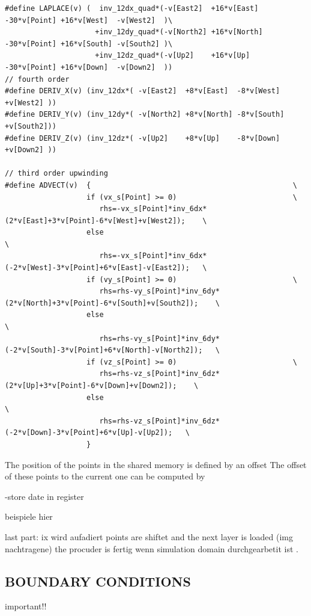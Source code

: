 \begin{verbatim}
#define LAPLACE(v) (  inv_12dx_quad*(-v[East2]  +16*v[East]  -30*v[Point] +16*v[West]  -v[West2]  )\
                     +inv_12dy_quad*(-v[North2] +16*v[North] -30*v[Point] +16*v[South] -v[South2] )\
                     +inv_12dz_quad*(-v[Up2]    +16*v[Up]    -30*v[Point] +16*v[Down]  -v[Down2]  ))
// fourth order
#define DERIV_X(v) (inv_12dx*( -v[East2]  +8*v[East]  -8*v[West]  +v[West2] ))
#define DERIV_Y(v) (inv_12dy*( -v[North2] +8*v[North] -8*v[South] +v[South2]))
#define DERIV_Z(v) (inv_12dz*( -v[Up2]    +8*v[Up]    -8*v[Down]  +v[Down2] ))

// third order upwinding
#define ADVECT(v)  {                                               \
                   if (vx_s[Point] >= 0)                           \
                      rhs=-vx_s[Point]*inv_6dx*(2*v[East]+3*v[Point]-6*v[West]+v[West2]);    \
                   else                                                           \
                      rhs=-vx_s[Point]*inv_6dx*(-2*v[West]-3*v[Point]+6*v[East]-v[East2]);   \
                   if (vy_s[Point] >= 0)                           \
                      rhs=rhs-vy_s[Point]*inv_6dy*(2*v[North]+3*v[Point]-6*v[South]+v[South2]);    \
                   else                                                           \
                      rhs=rhs-vy_s[Point]*inv_6dy*(-2*v[South]-3*v[Point]+6*v[North]-v[North2]);   \
                   if (vz_s[Point] >= 0)                           \
                      rhs=rhs-vz_s[Point]*inv_6dz*(2*v[Up]+3*v[Point]-6*v[Down]+v[Down2]);    \
                   else                                                           \
                      rhs=rhs-vz_s[Point]*inv_6dz*(-2*v[Down]-3*v[Point]+6*v[Up]-v[Up2]);   \
                   }
\end{verbatim}

\clearpage

The position of the points in the shared memory is defined by an offset
The offset of these points to the current one can be computed by

-store date in register


beispiele hier

last part:
ix wird aufadiert points are shiftet  and the next layer is loaded (img nachtragene)
the procuder is fertig wenn simulation domain  durchgearbetit ist .



\clearpage

\subsection{BOUNDARY CONDITIONS}
important!!

